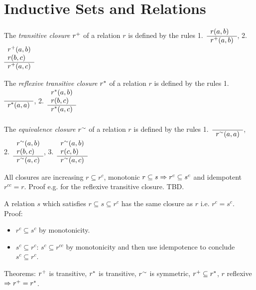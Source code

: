 \section{Inductive Sets and Relations}


\begin{definition} The \emph{transitive closure} $r^+$ of a relation $r$ is
  defined by the rules
1.~$\begin{array}{l} r(a,b) \\ \hline r^+(a,b)\end{array}$,
2.~$\begin{array}{l} r^+(a,b) \\ r(b,c) \\ \hline r^+(a,c)\end{array}$
\end{definition}

\begin{definition} The \emph{reflexive transitive closure} $r^*$ of a relation $r$ is
  defined by the rules
1.~$\begin{array}{l}  \\ \hline r^*(a,a)\end{array}$,
2.~$\begin{array}{l} r^*(a,b) \\ r(b,c) \\ \hline r^*(a,c)\end{array}$
\end{definition}

\begin{definition} The \emph{equivalence closure} $r^\sim$ of a relation $r$ is
  defined by the rules
  1.~$\begin{array}{l}  \\ \hline r^\sim(a,a)\end{array}$,
  2.~$\begin{array}{l} r^\sim(a,b)
    \\ r(b,c) \\ \hline r^\sim(a,c)\end{array}$,
  3.~$\begin{array}{l} r^\sim(a,b) \\ r(c,b) \\ \hline r^\sim(a,c)\end{array}$
\end{definition}

\begin{theorem}
  All closures are increasing $r \subseteq r^c$, monotonic
  $r \subseteq s \Rightarrow r^c \subseteq s^c$ and idempotent $r^{cc} = r$. Proof
  e.g. for the reflexive transitive closure. TBD.
\end{theorem}

\begin{theorem}
A relation $s$ which satisfies $r \subseteq s \subseteq r^c$ has the same closure
as $r$ i.e. $r^c = s^c$. Proof:
  \begin{itemize}
  \item $r^c \subseteq s^c$ by monotonicity.
  \item $s^c \subseteq r^c$: $s^c \subseteq r^{cc}$ by
    monotonicity and then use idempotence to conclude $s^c \subseteq r^c$.
  \end{itemize}
\end{theorem}



Theorems: $r^+$ is transitive, $r^*$ is transitive, $r^\sim$ is
symmetric, $r^+\subseteq r^*$, $r$ reflexive $\Rightarrow r^+ =
r^*$.


